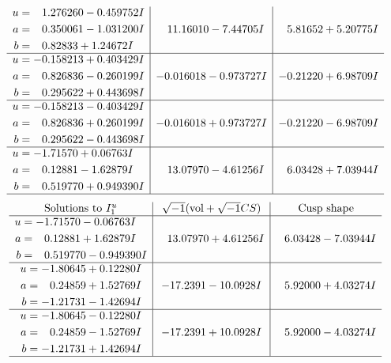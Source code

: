\documentclass[1p]{elsarticle_modified}
\theoremstyle{definition}
\newcommand{\I}{\sqrt{-1}}
\begin{document}
$$\begin{array}{c|c|c}
\begin{aligned}
u &= \phantom{-}1.276260 - 0.459752 I \\
a &= \phantom{-}0.350061 - 1.031200 I \\
b &= \phantom{-}0.82833 + 1.24672 I\end{aligned}
 & \phantom{-}11.16010 - 7.44705 I & \phantom{-}5.81652 + 5.20775 I \\ \hline\begin{aligned}
u &= -0.158213 + 0.403429 I \\
a &= \phantom{-}0.826836 - 0.260199 I \\
b &= \phantom{-}0.295622 + 0.443698 I\end{aligned}
 & -0.016018 - 0.973727 I & -0.21220 + 6.98709 I \\ \hline\begin{aligned}
u &= -0.158213 - 0.403429 I \\
a &= \phantom{-}0.826836 + 0.260199 I \\
b &= \phantom{-}0.295622 - 0.443698 I\end{aligned}
 & -0.016018 + 0.973727 I & -0.21220 - 6.98709 I \\ \hline\begin{aligned}
u &= -1.71570 + 0.06763 I \\
a &= \phantom{-}0.12881 - 1.62879 I \\
b &= \phantom{-}0.519770 + 0.949390 I\end{aligned}
 & \phantom{-}13.07970 - 4.61256 I & \phantom{-}6.03428 + 7.03944 I\\
 \hline 
 \end{array}$$\newpage$$\begin{array}{c|c|c}  
\text{Solutions to }I^u_{1}& \I (\text{vol} + \sqrt{-1}CS) & \text{Cusp shape}\\
 \hline 
\begin{aligned}
u &= -1.71570 - 0.06763 I \\
a &= \phantom{-}0.12881 + 1.62879 I \\
b &= \phantom{-}0.519770 - 0.949390 I\end{aligned}
 & \phantom{-}13.07970 + 4.61256 I & \phantom{-}6.03428 - 7.03944 I \\ \hline\begin{aligned}
u &= -1.80645 + 0.12280 I \\
a &= \phantom{-}0.24859 + 1.52769 I \\
b &= -1.21731 - 1.42694 I\end{aligned}
 & -17.2391 - 10.0928 I & \phantom{-}5.92000 + 4.03274 I \\ \hline\begin{aligned}
u &= -1.80645 - 0.12280 I \\
a &= \phantom{-}0.24859 - 1.52769 I \\
b &= -1.21731 + 1.42694 I\end{aligned}
 & -17.2391 + 10.0928 I & \phantom{-}5.92000 - 4.03274 I\\
 \hline 
 \end{array}$$\newpage\newpage\renewcommand{\arraystretch}{1}
\end{document}
